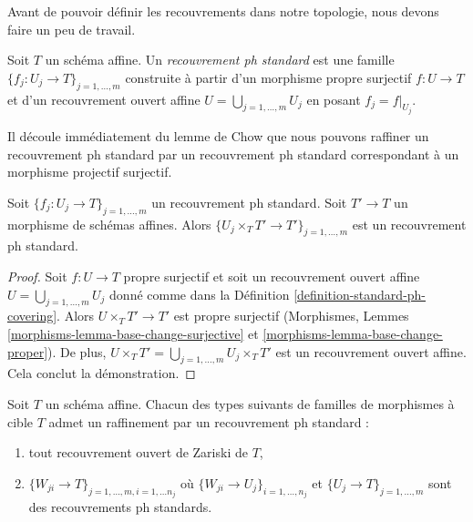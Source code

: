 \medskip\noindent
Avant de pouvoir définir les recouvrements dans notre topologie, nous devons faire un peu de travail.

\begin{definition}
\label{definition-standard-ph-covering}
Soit $T$ un schéma affine. Un {\it recouvrement ph standard} est une famille $\{f_j : U_j \to T\}_{j = 1, \ldots, m}$ construite à partir d'un morphisme propre surjectif $f : U \to T$ et d'un recouvrement ouvert affine $U = \bigcup_{j = 1, \ldots, m} U_j$ en posant $f_j = f|_{U_j}$.
\end{definition}

\noindent
Il découle immédiatement du lemme de Chow que nous pouvons raffiner un recouvrement ph standard par un recouvrement ph standard correspondant à un morphisme projectif surjectif.

\begin{lemma}
\label{lemma-base-change-standard-ph}
Soit $\{f_j : U_j \to T\}_{j = 1, \ldots, m}$ un recouvrement ph standard. Soit $T' \to T$ un morphisme de schémas affines. Alors $\{U_j \times_T T' \to T'\}_{j = 1, \ldots, m}$ est un recouvrement ph standard.
\end{lemma}

\begin{proof}
Soit $f : U \to T$ propre surjectif et soit un recouvrement ouvert affine $U = \bigcup_{j = 1, \ldots, m} U_j$ donné comme dans la Définition \ref{definition-standard-ph-covering}. Alors $U \times_T T' \to T'$ est propre surjectif (Morphismes, Lemmes \ref{morphisms-lemma-base-change-surjective} et \ref{morphisms-lemma-base-change-proper}). De plus, $U \times_T T' = \bigcup_{j = 1, \ldots, m} U_j \times_T T'$ est un recouvrement ouvert affine. Cela conclut la démonstration.
\end{proof}


\begin{lemma}
\label{lemma-refine-by-standard-ph}
Soit $T$ un schéma affine. Chacun des types suivants de familles de morphismes à cible $T$ admet un raffinement par un recouvrement ph standard :
\begin{enumerate}
\item tout recouvrement ouvert de Zariski de $T$,
\item $\{W_{ji} \to T\}_{j = 1, \ldots, m, i = 1, \ldots n_j}$ où $\{W_{ji} \to U_j\}_{i = 1, \ldots, n_j}$ et $\{U_j \to T\}_{j = 1, \ldots, m}$ sont des recouvrements ph standards.
\end{enumerate}
\end{lemma}

